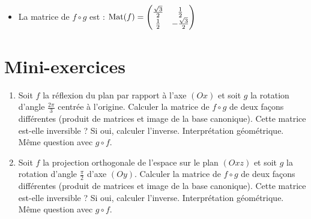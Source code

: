 \begin{frame}
\begin{exemple}
\begin{itemize}[<+->]
  \item La matrice de $f \circ g$ est :
$\mathop{\text{Mat}}\nolimits(f) = 
\begin{pmatrix}
\frac{\sqrt{3}}{2} &  \frac12  \\
\frac12& -\frac{\sqrt{3}}{2}\\            
\end{pmatrix}$

\end{itemize}
\end{exemple}
\end{frame}


\section{Mini-exercices}

\begin{frame}
\begin{miniexercice}
\begin{enumerate}
  \item Soit $f$ la réflexion du plan par rapport à l'axe $(Ox)$ et soit $g$
  la rotation d'angle $\frac{2\pi}{3}$ centrée à l'ori\-gine. Calculer la matrice de 
  $f\circ g$ de deux façons différentes (produit de matrices et image de la base canonique).
  Cette matrice est-elle inversible ? Si oui, calculer l'inverse. Interprétation géométrique.
  Même question avec $g\circ f$.
  
  \item Soit $f$ la projection orthogonale de l'espace sur le plan $(Oxz)$ et soit $g$
  la rotation d'angle $\frac{\pi}{2}$ d'axe $(Oy)$. Calculer la matrice de 
  $f\circ g$ de deux façons différentes (produit de matrices et image de la base canonique).
  Cette matrice est-elle inversible ? Si oui, calculer l'inverse. Interprétation géométrique.
  Même question avec $g\circ f$.  
\end{enumerate}
\end{miniexercice}
\end{frame}


